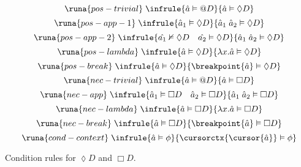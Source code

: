 \begin{table}[H]
    \centering
    \begin{multicols}{2}
    \begin{equation*}
        \runa{pos-trivial}\; \infrule{\hat{a} \vDash @D}{\hat{a} \vDash \lozenge D}        
    \end{equation*}\break
    \begin{equation*}
        \runa{pos-app-1}\; \infrule{\hat{a}_1 \vDash \lozenge D}{\hat{a}_1\; \hat{a}_2 \vDash \lozenge D}
    \end{equation*}\break
    \begin{equation*}
        \runa{pos-app-2}\; \infrule{\hat{a_1} \nvDash \lozenge D \quad \hat{a_2} \vDash \lozenge D}{\hat{a}_1 \; \hat{a}_2 \vDash \lozenge D}
    \end{equation*}\break
    \begin{equation*}
        \runa{pos-lambda}\; \infrule{\hat{a} \vDash \lozenge D}{\lambda x.\hat{a} \vDash \lozenge D}
    \end{equation*}\break
    \begin{equation*}
        \runa{pos-break}\; \infrule{\hat{a} \vDash \lozenge D}{\breakpoint{\hat{a}} \vDash \lozenge D}
    \end{equation*}\break
    \begin{equation*}
        \runa{nec-trivial}\; \infrule{\hat{a} \vDash @D}{\hat{a} \vDash \Box D}        
    \end{equation*}\break
    \begin{equation*}
        \runa{nec-app}\; \infrule{\hat{a}_1 \vDash \Box D \quad \hat{a}_2 \vDash \Box D}{\hat{a}_1\; \hat{a}_2 \vDash \Box D}        
    \end{equation*}\break
    \begin{equation*}
        \runa{nec-lambda}\; \infrule{\hat{a} \vDash \Box D}{\lambda x.\hat{a}  \vDash \Box D}
    \end{equation*}\break
    \begin{equation*}
        \runa{nec-break}\; \infrule{\hat{a} \vDash \Box D}{\breakpoint{\hat{a}}  \vDash \Box D}
    \end{equation*}\break
    \begin{equation*}
        \runa{cond-context}\; \infrule{\hat{a} \vDash \phi}{\cursorctx{\cursor{\hat{a}}} \vDash \phi}
    \end{equation*}
    \end{multicols}
    \caption{Condition rules for $\lozenge D$ and $\Box D$.}
    \label{tab:EEsemcond2}
\end{table}
%
